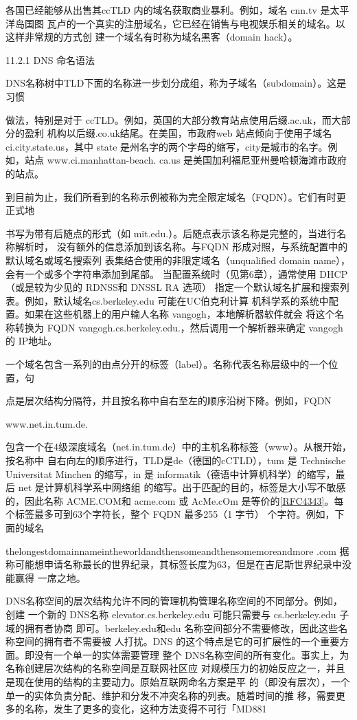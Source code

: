 各国已经能够从出售其ccTLD 内的域名获取商业暴利。例如，域名 cnn.tv 是太平洋岛国图
瓦卢的一个真实的注册域名，它已经在销售与电视娱乐相关的域名。以这样非常规的方式创
建一个域名有时称为域名黑客（domain hack）。

11.2.1 DNS 命名语法

DNS名称树中TLD下面的名称进一步划分成组，称为子域名（subdomain）。这是习惯

做法，特别是对于 ccTLD。例如，英国的大部分教育站点使用后缀.ac.uk，而大部分的盈利
机构以后缀.co.uk结尾。在美国，市政府web 站点倾向于使用子域名 ci.city.state.us，其中
state 是州名字的两个字母的缩写，city是城市的名字。例如，站点 www.ci.manhattan-beach.
ca.us 是美国加利福尼亚州曼哈顿海滩市政府的站点。

到目前为止，我们所看到的名称示例被称为完全限定域名（FQDN）。它们有时更正式地

书写为带有后随点的形式（如 mit.edu.）。后随点表示该名称是完整的，当进行名称解析时，
没有额外的信息添加到该名称。与FQDN 形成对照，与系统配置中的默认域名或域名搜索列
表集结合使用的非限定域名（unqualified domain name），会有一个或多个字符串添加到尾部。
当配置系统时（见第6章），通常使用 DHCP（或是较为少见的 RDNSS和 DNSSL RA 选项）
指定一个默认域名扩展和搜索列表。例如，默认域名cs.berkeley.edu 可能在UC伯克利计算
机科学系的系统中配置。如果在这些机器上的用户输人名称 vangogh，本地解析器软件就会
将这个名称转换为 FQDN vangogh.cs.berkeley.edu.，然后调用一个解析器来确定 vangogh 的
IP地址。

一个域名包含一系列的由点分开的标签（label）。名称代表名称层级中的一个位置，句

点是层次结构分隔符，并且按名称中自右至左的顺序沿树下降。例如，FQDN

www.net.in.tum.de.

包含一个在4级深度域名（net.in.tum.de）中的主机名称标签（www）。从根开始，按名称中
自右向左的顺序进行，TLD是de（德国的cCTLD），tum 是 Technische Universitat Minchen
的缩写，in 是 informatik（德语中计算机科学）的缩写，最后 net 是计算机科学系中网络组
的缩写。出于匹配的目的，标签是大小写不敏感的，因此名称 ACME.COM和 acme.com 或
AcMe.cOm 是等价的\href{https://www.rfc-editor.org/rfc/rfc4343}{[RFC4343]}。每个标签最多可到63个字符长，整个 FQDN 最多255（1
字节） 个字符。例如，下面的域名

thelongestdomainnameintheworldandthensomeandthensomemoreandmore .com
据称可能想申请名称最长的世界纪录，其标签长度为63，但是在吉尼斯世界纪录中没能赢得
一席之地。

DNS名称空间的层次结构允许不同的管理机构管理名称空间的不同部分。例如，创建
一个新的 DNS名称 elevator.cs.berkeley.edu 可能只需要与 cs.berkeley.edu 子域的拥有者协商
即可。berkeley.edu和edu 名称空间部分不需要修改，因此这些名称空间的拥有者不需要被
人打扰。DNS 的这个特点是它的可扩展性的一个重要方面。即没有一个单一的实体需要管理
整个 DNS名称空间的所有变化。事实上，为名称创建层次结构的名称空间是互联网社区应
对规模压力的初始反应之一，并且是现在使用的结构的主要动力。原始互联网命名方案是平
的（即没有层次），一个单一的实体负责分配、维护和分发不冲突名称的列表。随着时间的推
移，需要更多的名称，发生了更多的变化，这种方法变得不可行「MD881

